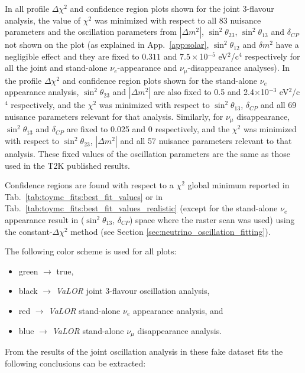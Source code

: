 In all profile $\Delta\chi^2$ and confidence region plots shown for the joint 3-flavour analysis,
the value of $\chi^2$ was minimized with respect to all 83 nuisance parameters
and the oscillation parameters from $|\Delta m^{2}|$, $\sin^{2}\theta_{23}$, $\sin^{2}\theta_{13}$ and $\delta_{CP}$ not 
shown on the plot (as explained in App.\ \ref{app:solar}, $\sin^{2}\theta_{12}$ and $\delta m^{2}$ have a negligible effect and they are fixed to 
$0.311$ and $7.5\times$10$^{-5}$ eV$^{2}$/c$^{4}$ respectively for all the joint and stand-alone 
$\nu_{e}$-appearance and $\nu_{\mu}$-disappearance analyses).
In the profile $\Delta\chi^2$ and confidence region plots shown for 
the stand-alone $\nu_{e}$ appearance analysis, $\sin^{2}\theta_{23}$ and $|\Delta m^{2}|$ are also fixed to 0.5 and 
2.4$\times$10$^{-3}$ eV$^{2}$/c$^{4}$ respectively, and the $\chi^2$ was minimized with respect to $\sin^{2}\theta_{13}$, 
$\delta_{CP}$ and all 69 nuisance parameters relevant for that analysis. 
Similarly, for $\nu_{\mu}$ disappearance, $\sin^{2}\theta_{13}$ and $\delta_{CP}$ are fixed to 0.025 and 0 respectively,
and the $\chi^2$ was minimized with respect to $\sin^{2}\theta_{23}$, $|\Delta m^{2}|$ and all 57 nuisance parameters
relevant to that analysis. These fixed values of the oscillation parameters are the same as those used in the T2K published results. 

Confidence regions are found with respect to a $\chi^{2}$ global minimum reported in Tab.\ \ref{tab:toymc_fits:best_fit_values}
or in Tab.\ \ref{tab:toymc_fits:best_fit_values_realistic}
(except for the stand-alone $\nu_{e}$ appearance result in ($\sin^{2}\theta_{13}$, $\delta_{CP}$) space
where the raster scan was used) using the constant-$\Delta\chi^{2}$ method (see Section \ref{sec:neutrino_oscillation_fitting}).

The following color scheme is used for all plots:
\begin{itemize}
\item green $\rightarrow$ true,
\item black $\rightarrow$ {\em VaLOR} joint 3-flavour oscillation analysis,
\item red   $\rightarrow$ {\em VaLOR} stand-alone $\nu_{e}$ appearance analysis, and
\item blue  $\rightarrow$ {\em VaLOR} stand-alone $\nu_{\mu}$ disappearance analysis.
\end{itemize}


From the results of the joint oscillation analysis in these fake dataset fits the following conclusions can be extracted:

